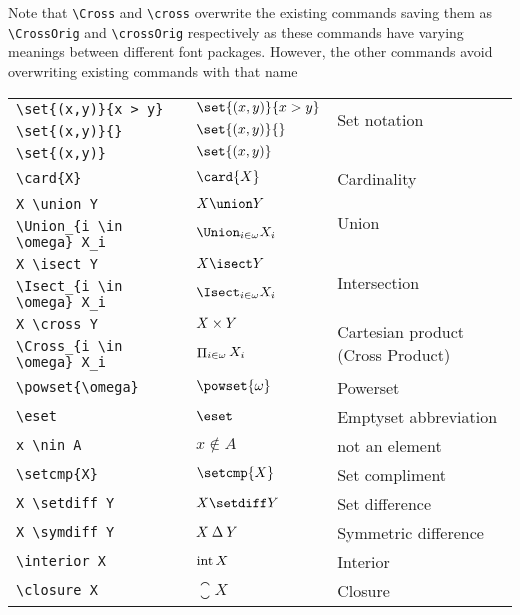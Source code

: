 \documentclass[leqno,11pt]{amsart}
\begin{document}
Note that \verb=\Cross= and \verb=\cross= overwrite the existing commands saving them as \verb=\CrossOrig= and \verb=\crossOrig= respectively as these commands have varying meanings between different font packages.  However, the other commands avoid overwriting existing commands with that name 

\begin{tabular}{l |  l | l}\toprule
	\verb=\set{(x,y)}{x > y}=	  &    \(   \set{(x,y)}{x > y} \)    & \multirow{2}{*}{Set notation}  \\[6pt]
	\verb=\set{(x,y)}{}=		  &    \(   \set{(x,y)}{}      \)    &  \\ \midrule
	\verb=\set{(x,y)}=			  & 	\(   \set{(x,y)}      \)    &  \\ \midrule
	\verb=\card{X}=                          &    \(   \card{X}                   \)    & Cardinality \\ \midrule
	\verb=X \union Y=                        &    \(   X \union Y                 \)    & \multirow{2}{*}{Union}  \\[6pt]
	\verb=\Union_{i \in \omega} X_i=         &    \(   \Union_{i \in \omega} X_i  \)    &  \\ \midrule
	\verb=X \isect Y=                        &    \(   X \isect Y                 \)    & \multirow{2}{*}{Intersection} \\[6pt]
	\verb=\Isect_{i \in \omega} X_i=         &    \(   \Isect_{i \in \omega} X_i  \)    &  \\ \midrule
	\verb=X \cross Y=                        &    \(   X \mathbin{\times} Y                 \)    & \multirow{2}{*}{Cartesian product (Cross Product)} \\[6pt]
	\verb=\Cross_{i \in \omega} X_i=         &    \(   \mathop{\Pi}_{i \in \omega} X_i  \)    &  \\ \midrule
	\verb=\powset{\omega}=                   &    \(   \powset{\omega}            \)    &  Powerset \\ \midrule
	\verb=\eset=                             &    \(   \eset                      \)    &  Emptyset abbreviation\\ \midrule
	\verb=x \nin A=                          &    \(   x \nin A                   \)    &  not an element\\ \midrule
	\verb=\setcmp{X}=                        &    \(   \setcmp{X}                 \)    &  Set compliment\\\midrule
	\verb=X \setdiff Y=                     &    \(   X \setdiff Y              \)    & Set difference \\ \midrule
	\verb=X \symdiff Y=                      &    \(   X \mathbin{\Delta} Y               \)    & Symmetric difference \\ \midrule
	\verb=\interior X=                       &    \(   \operatorname{int} X                \)    & Interior \\ \midrule
	\verb=\closure X=                        &    \(   \closure X                 \)    & Closure \\ \midrule
		\bottomrule
	\end{tabular}          \\
\end{document}
